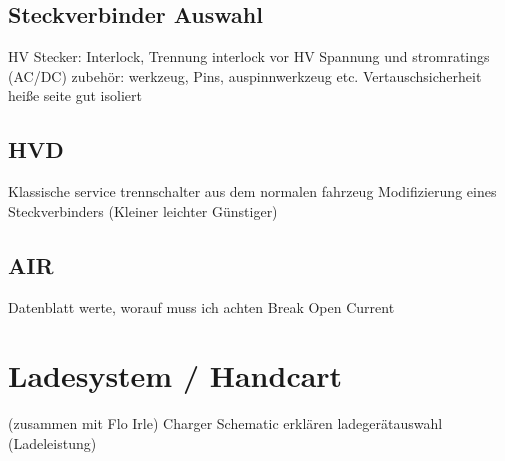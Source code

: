 \subsection{Steckverbinder Auswahl}
HV Stecker: Interlock, Trennung interlock vor HV
Spannung und stromratings (AC/DC)
zubehör: werkzeug, Pins, auspinnwerkzeug etc.
Vertauschsicherheit
heiße seite gut isoliert

\subsection{HVD}
Klassische service trennschalter aus dem normalen fahrzeug
Modifizierung eines Steckverbinders (Kleiner leichter Günstiger)


\subsection{AIR}
Datenblatt werte, worauf muss ich achten
Break Open Current

\section{Ladesystem / Handcart} (zusammen mit Flo Irle)
Charger Schematic erklären
ladegerätauswahl (Ladeleistung)

